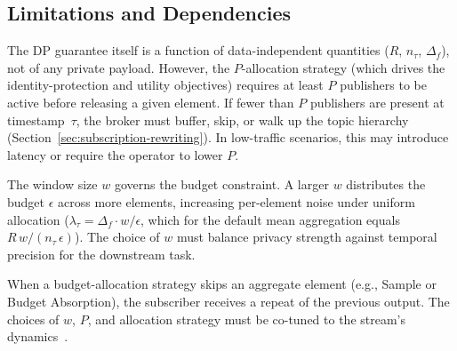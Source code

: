 \subsection{Limitations and Dependencies}
\label{sec:limitations}

The DP guarantee itself is a function of data-independent quantities ($R$, $n_\tau$, $\Delta_f$), not of any private payload. However, the $P$-allocation strategy (which drives the identity-protection and utility objectives) requires at least $P$ publishers to be active before releasing a given element. If fewer than $P$ publishers are present at timestamp~$\tau$, the broker must buffer, skip, or walk up the topic hierarchy (Section~\ref{sec:subscription-rewriting}). In low-traffic scenarios, this may introduce latency or require the operator to lower $P$.

The window size $w$ governs the budget constraint. A larger $w$ distributes the budget $\epsilon$ across more elements, increasing per-element noise under uniform allocation ($\lambda_\tau = \Delta_f \cdot w / \epsilon$, which for the default mean aggregation equals $R\,w/(n_\tau\,\epsilon)$). The choice of $w$ must balance privacy strength against temporal precision for the downstream task.


When a budget-allocation strategy skips an aggregate element (e.g., Sample or Budget Absorption), the subscriber receives a repeat of the previous output. The choices of $w$, $P$, and allocation strategy must be co-tuned to the stream's dynamics~\cite{kellaris2014,schaler2023,li2025spas}.


